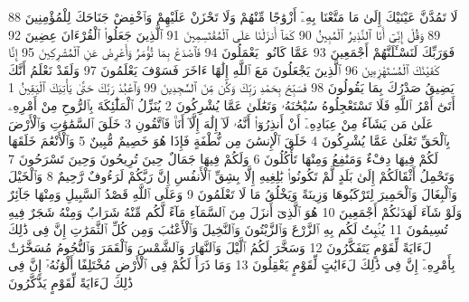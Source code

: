 {\tiny\colorbox{cl_aya}{88}} لَا تَمُدَّنَّ عَيْنَيْكَ إِلَىٰ مَا مَتَّعْنَا بِهِۦٓ أَزْوَٰجًا مِّنْهُمْ وَلَا تَحْزَنْ عَلَيْهِمْ وَٱخْفِضْ جَنَاحَكَ لِلْمُؤْمِنِينَ
{\tiny\colorbox{cl_aya}{89}} وَقُلْ إِنِّىٓ أَنَا ٱلنَّذِيرُ ٱلْمُبِينُ
{\tiny\colorbox{cl_aya}{90}} كَمَآ أَنزَلْنَا عَلَى ٱلْمُقْتَسِمِينَ
{\tiny\colorbox{cl_aya}{91}} ٱلَّذِينَ جَعَلُوا۟ ٱلْقُرْءَانَ عِضِينَ
{\tiny\colorbox{cl_aya}{92}} فَوَرَبِّكَ لَنَسْـَٔلَنَّهُمْ أَجْمَعِينَ
{\tiny\colorbox{cl_aya}{93}} عَمَّا كَانُوا۟ يَعْمَلُونَ
{\tiny\colorbox{cl_aya}{94}} فَٱصْدَعْ بِمَا تُؤْمَرُ وَأَعْرِضْ عَنِ ٱلْمُشْرِكِينَ
{\tiny\colorbox{cl_aya}{95}} إِنَّا كَفَيْنَٰكَ ٱلْمُسْتَهْزِءِينَ
{\tiny\colorbox{cl_aya}{96}} ٱلَّذِينَ يَجْعَلُونَ مَعَ ٱللَّهِ إِلَٰهًا ءَاخَرَ فَسَوْفَ يَعْلَمُونَ
{\tiny\colorbox{cl_aya}{97}} وَلَقَدْ نَعْلَمُ أَنَّكَ يَضِيقُ صَدْرُكَ بِمَا يَقُولُونَ
{\tiny\colorbox{cl_aya}{98}} فَسَبِّحْ بِحَمْدِ رَبِّكَ وَكُن مِّنَ ٱلسَّٰجِدِينَ
{\tiny\colorbox{cl_aya}{99}} وَٱعْبُدْ رَبَّكَ حَتَّىٰ يَأْتِيَكَ ٱلْيَقِينُ
{\tiny\colorbox{cl_aya}{1}} أَتَىٰٓ أَمْرُ ٱللَّهِ فَلَا تَسْتَعْجِلُوهُ سُبْحَٰنَهُۥ وَتَعَٰلَىٰ عَمَّا يُشْرِكُونَ
{\tiny\colorbox{cl_aya}{2}} يُنَزِّلُ ٱلْمَلَٰٓئِكَةَ بِٱلرُّوحِ مِنْ أَمْرِهِۦ عَلَىٰ مَن يَشَآءُ مِنْ عِبَادِهِۦٓ أَنْ أَنذِرُوٓا۟ أَنَّهُۥ لَآ إِلَٰهَ إِلَّآ أَنَا۠ فَٱتَّقُونِ
{\tiny\colorbox{cl_aya}{3}} خَلَقَ ٱلسَّمَٰوَٰتِ وَٱلْأَرْضَ بِٱلْحَقِّ تَعَٰلَىٰ عَمَّا يُشْرِكُونَ
{\tiny\colorbox{cl_aya}{4}} خَلَقَ ٱلْإِنسَٰنَ مِن نُّطْفَةٍ فَإِذَا هُوَ خَصِيمٌ مُّبِينٌ
{\tiny\colorbox{cl_aya}{5}} وَٱلْأَنْعَٰمَ خَلَقَهَا لَكُمْ فِيهَا دِفْءٌ وَمَنَٰفِعُ وَمِنْهَا تَأْكُلُونَ
{\tiny\colorbox{cl_aya}{6}} وَلَكُمْ فِيهَا جَمَالٌ حِينَ تُرِيحُونَ وَحِينَ تَسْرَحُونَ
{\tiny\colorbox{cl_aya}{7}} وَتَحْمِلُ أَثْقَالَكُمْ إِلَىٰ بَلَدٍ لَّمْ تَكُونُوا۟ بَٰلِغِيهِ إِلَّا بِشِقِّ ٱلْأَنفُسِ إِنَّ رَبَّكُمْ لَرَءُوفٌ رَّحِيمٌ
{\tiny\colorbox{cl_aya}{8}} وَٱلْخَيْلَ وَٱلْبِغَالَ وَٱلْحَمِيرَ لِتَرْكَبُوهَا وَزِينَةً وَيَخْلُقُ مَا لَا تَعْلَمُونَ
{\tiny\colorbox{cl_aya}{9}} وَعَلَى ٱللَّهِ قَصْدُ ٱلسَّبِيلِ وَمِنْهَا جَآئِرٌ وَلَوْ شَآءَ لَهَدَىٰكُمْ أَجْمَعِينَ
{\tiny\colorbox{cl_aya}{10}} هُوَ ٱلَّذِىٓ أَنزَلَ مِنَ ٱلسَّمَآءِ مَآءً لَّكُم مِّنْهُ شَرَابٌ وَمِنْهُ شَجَرٌ فِيهِ تُسِيمُونَ
{\tiny\colorbox{cl_aya}{11}} يُنۢبِتُ لَكُم بِهِ ٱلزَّرْعَ وَٱلزَّيْتُونَ وَٱلنَّخِيلَ وَٱلْأَعْنَٰبَ وَمِن كُلِّ ٱلثَّمَرَٰتِ إِنَّ فِى ذَٰلِكَ لَءَايَةً لِّقَوْمٍ يَتَفَكَّرُونَ
{\tiny\colorbox{cl_aya}{12}} وَسَخَّرَ لَكُمُ ٱلَّيْلَ وَٱلنَّهَارَ وَٱلشَّمْسَ وَٱلْقَمَرَ وَٱلنُّجُومُ مُسَخَّرَٰتٌۢ بِأَمْرِهِۦٓ إِنَّ فِى ذَٰلِكَ لَءَايَٰتٍ لِّقَوْمٍ يَعْقِلُونَ
{\tiny\colorbox{cl_aya}{13}} وَمَا ذَرَأَ لَكُمْ فِى ٱلْأَرْضِ مُخْتَلِفًا أَلْوَٰنُهُۥٓ إِنَّ فِى ذَٰلِكَ لَءَايَةً لِّقَوْمٍ يَذَّكَّرُونَ
